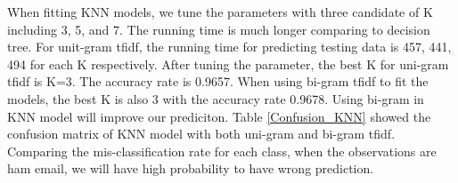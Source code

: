 
When fitting KNN models, we tune the parameters with three candidate of K including 3, 5, and 7. The running time is much longer comparing to decision tree. For unit-gram tfidf, the running time for predicting testing data is 457, 441, 494 for each K respectively. After tuning the parameter, the best K for uni-gram tfidf is K=3. The accuracy rate is 0.9657. When using bi-gram tfidf to fit the models, the best K is also 3 with the accuracy rate 0.9678. Using bi-gram in KNN model will improve our prediciton. Table \ref{Confusion_KNN} showed the confusion matrix of KNN model with both uni-gram and bi-gram tfidf. Comparing the mis-classification rate for each class, when the observations are ham email, we will have high probability to have wrong prediction.\\

